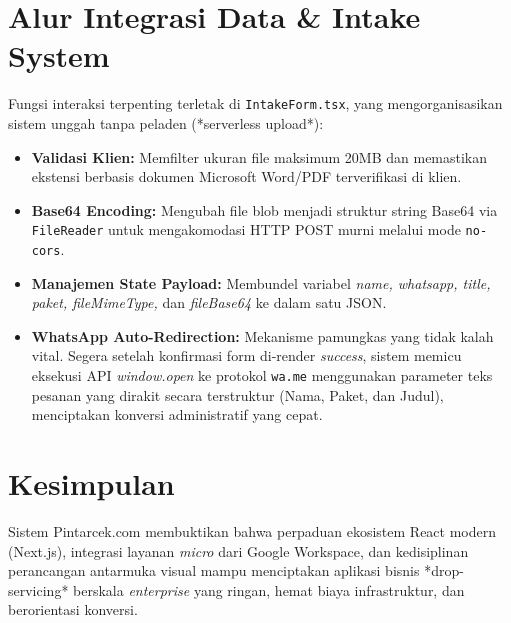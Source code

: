 \documentclass[12pt,a4paper]{article}
\begin{document}
\section{Alur Integrasi Data \& Intake System}
Fungsi interaksi terpenting terletak di \texttt{IntakeForm.tsx}, yang mengorganisasikan sistem unggah tanpa peladen (*serverless upload*):
\begin{itemize}
    \item \textbf{Validasi Klien:} Memfilter ukuran file maksimum 20MB dan memastikan ekstensi berbasis dokumen Microsoft Word/PDF terverifikasi di klien.
    \item \textbf{Base64 Encoding:} Mengubah file blob menjadi struktur string Base64 via \texttt{FileReader} untuk mengakomodasi HTTP POST murni melalui mode \texttt{no-cors}.
    \item \textbf{Manajemen State Payload:} Membundel variabel \textit{name, whatsapp, title, paket, fileMimeType,} dan \textit{fileBase64} ke dalam satu JSON.
    \item \textbf{WhatsApp Auto-Redirection:} Mekanisme pamungkas yang tidak kalah vital. Segera setelah konfirmasi form di-render \textit{success}, sistem memicu eksekusi API \textit{window.open} ke protokol \texttt{wa.me} menggunakan parameter teks pesanan yang dirakit secara terstruktur (Nama, Paket, dan Judul), menciptakan konversi administratif yang cepat.
\end{itemize}

\section{Kesimpulan}
Sistem Pintarcek.com membuktikan bahwa perpaduan ekosistem React modern (Next.js), integrasi layanan \textit{micro} dari Google Workspace, dan kedisiplinan perancangan antarmuka visual mampu menciptakan aplikasi bisnis *drop-servicing* berskala \textit{enterprise} yang ringan, hemat biaya infrastruktur, dan berorientasi konversi.
\end{document}
